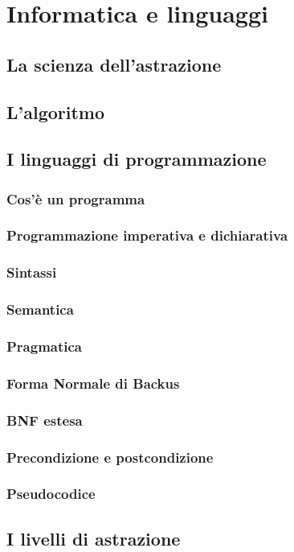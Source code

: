 \chapter{Informatica e linguaggi}
\section{La scienza dell'astrazione}
\section{L'algoritmo}
\section{I linguaggi di programmazione}
\subsection{Cos'è un programma}
\subsection{Programmazione imperativa e dichiarativa}
\subsection{Sintassi}
\subsection{Semantica}
\subsection{Pragmatica}
\subsection{Forma Normale di Backus}
\subsection{BNF estesa}
\subsection{Precondizione e postcondizione}
\subsection{Pseudocodice}
\section{I livelli di astrazione}
